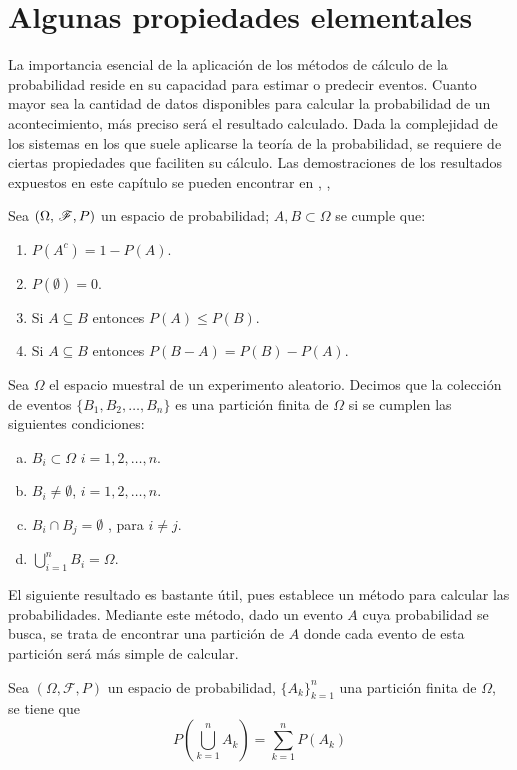 \section{Algunas propiedades elementales}

La importancia esencial de la aplicación de los métodos de cálculo de la probabilidad reside en su capacidad para estimar o predecir eventos. Cuanto mayor sea la cantidad de datos disponibles para calcular la probabilidad de un acontecimiento, más preciso será el resultado calculado. Dada la complejidad de los sistemas en los que suele aplicarse la teoría de la probabilidad, se requiere de ciertas propiedades que faciliten su cálculo.
Las demostraciones de los resultados expuestos en este capítulo se pueden encontrar en \cite{intro-probabilidad}, \cite{Feller},\cite{Rincon1} \cite{Rincon2}
\begin{Prop}
    Sea $(\Omega,\thinspace\mathscr{F},P)$ un espacio de probabilidad; $A,B\subset\Omega$ se cumple que:
    \begin{enumerate}
        \item $P(A^c)=1-P(A)$.
        \item $P(\emptyset)=0$.
        \item Si $A\subseteq B$ entonces $P(A)\leq P(B)$.
        \item Si $A\subseteq B$ entonces $P(B-A)=P(B)-P(A)$.
    \end{enumerate}
\end{Prop}
\begin{Def}
    Sea $\Omega$ el espacio muestral de un experimento aleatorio. Decimos que la colección de eventos $\{B_1,B_2,\ldots,B_n\}$ es una partición finita de $\Omega$ si se cumplen las siguientes condiciones:
    \begin{enumerate}[a)]
        \item $B_i\subset\Omega$ $i=1,2,\ldots,n$.
        \item $B_i\not=\emptyset$, $i=1,2,\ldots,n$.
        \item $B_i\cap B_j=\emptyset$ , para $i\not= j$.
        \item $\bigcup_{i=1}^n B_i=\Omega$.
    \end{enumerate}
\end{Def}
El siguiente resultado es bastante útil, pues establece un método para calcular las probabilidades. Mediante este método, dado un evento $A$ cuya probabilidad se busca, se trata de encontrar una partición de $A$ donde cada evento de esta partición será más simple de calcular.
\begin{Prop}
    Sea $(\Omega,\mathscr{F},P)$ un espacio de probabilidad, $\{A_k\}_{k=1}^n$ una partición finita de $\Omega$, se tiene que
    $$P(\bigcup_{k=1}^n A_k)=\sum_{k=1}^n P(A_k)$$ 
\end{Prop}
